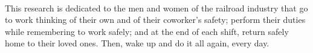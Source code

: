 \begin{center}
\\
\end{center}
\vspace{40pt}

This research is dedicated to the men and women of the railroad industry that go to work thinking of their own and of their coworker's safety; perform their duties while remembering to work safely; and at the end of each shift, return safely home to their loved ones. Then, wake up and do it all again, every day.